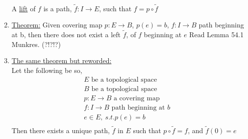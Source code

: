 \begin{enumerate}
\begin{align*}
            \end{align*}
            A \underline{lift} of $f$ is a path, $\tilde{f}: I\rightarrow E$, such that
            $f=p\circ \tilde{f}$
        \item \underline{Theorem:} Given covering map $p:E\rightarrow B$, $p(e)=b$,
            $f:I \rightarrow B$ path beginning at b, then there does not exist a left $\tilde{f}$,
            of $f$ beginning at $e$ Read Lemma 54.1 Munkres. (?!?!?)
        \item \underline{The same theorem but reworded:}\\
            Let the following be so,
            \begin{align*}
                E \text{ be a topological space}\\
                B \text{ be a topological space}\\
                p:E \rightarrow B \text{ a covering map}\\
                f:I \rightarrow B \text{ path beginning at $b$ }\\
                e \in E,\ s.t. p(e)=b\\
            \end{align*}
            Then there exists a unique path, $\tilde{f}$ in $E$ such that $p\circ \tilde{f}=f$, and
            $\tilde{f}(0)=e$
    \end{enumerate}
